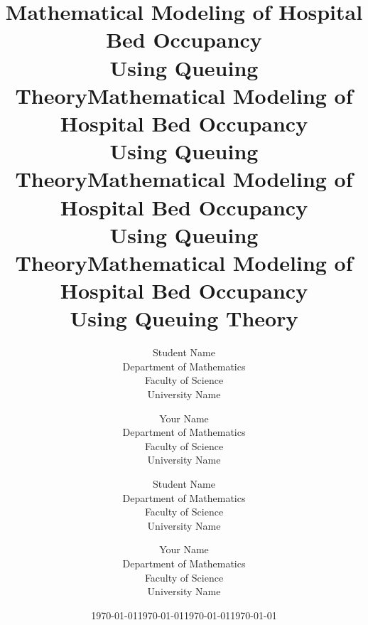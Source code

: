 \documentclass[12pt, a4paper]{book}
\title{\Large\textbf{Mathematical Modeling of Hospital Bed Occupancy\\Using Queuing Theory}}
\author{Student Name\\[2ex]
        \normalsize Department of Mathematics\\
        Faculty of Science\\
        University Name}
\date{\today}
\title{\Large\textbf{Mathematical Modeling of Hospital Bed Occupancy\\Using Queuing Theory}}
\author{Your Name\\[2ex]
        \normalsize Department of Mathematics\\
        Faculty of Science\\
        University Name}
\date{\today}
\let\cleardoublepage\clearpage
\let\cleardoublepage\clearpage
\begin{document}
\let\cleardoublepage\clearpage

\title{\Large\textbf{Mathematical Modeling of Hospital Bed Occupancy\\Using Queuing Theory}}
\author{Student Name\\[2ex]
        \normalsize Department of Mathematics\\
        Faculty of Science\\
        University Name}
\date{\today}


\hypersetup{
    colorlinks=true,
    linkcolor=black,
    urlcolor=blue,
    citecolor=blue
}



\let\cleardoublepage\clearpage

\title{\Large\textbf{Mathematical Modeling of Hospital Bed Occupancy\\Using Queuing Theory}}
\author{Your Name\\[2ex]
        \normalsize Department of Mathematics\\
        Faculty of Science\\
        University Name}
\date{\today}
\end{document}
